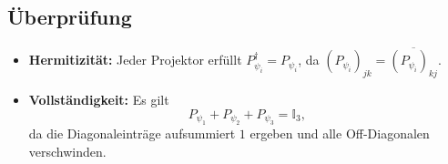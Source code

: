 \documentclass[11pt]{scrartcl}
\begin{document}
\subsection*{Überprüfung}

\begin{itemize}
  \item \textbf{Hermitizität:} Jeder Projektor erfüllt
    \(P_{\psi_i}^\dagger = P_{\psi_i}\), da
    \((P_{\psi_i})_{jk} = \overline{(P_{\psi_i})_{kj}}\).
  \item \textbf{Vollständigkeit:} Es gilt
    \[
      P_{\psi_1} + P_{\psi_2} + P_{\psi_3}
      = \mathbb{I}_3,
    \]
    da die Diagonaleinträge aufsummiert \(1\) ergeben und alle Off-Diagonalen verschwinden.
\end{itemize}
\end{document}
